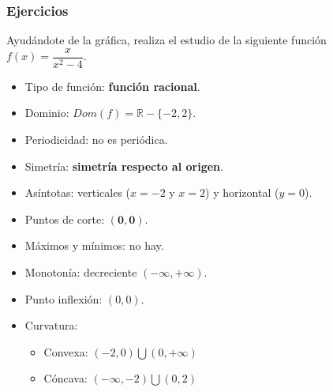\subsubsection{Ejercicios}
\begin{ex}
	Ayudándote de la gráfica, realiza el estudio de la siguiente función $f(x)=\dfrac{x}{x^2-4}$.
	\begin{sol}
		\begin{itemize}
			\item Tipo de función: \textbf{función racional}.
			\item Dominio: $Dom(f) = \mathbb{R}-\{-2, 2\}$.
			\item Periodicidad: no es periódica.
			\item Simetría: \textbf{simetría respecto al origen}.
			\item Asíntotas: verticales ($x=-2$ y $x=2$) y horizontal ($y=0$).
			\item Puntos de corte: $\mathbf{(0,0)}$.
			\item Máximos y mínimos: no hay.
			\item Monotonía: decreciente $(-\infty , +\infty)$.
			\item Punto inflexión: $(0,0)$.
			\item Curvatura:
			\begin{itemize}
				\item Convexa: $(-2, 0) \bigcup (0, +\infty)$
				\item Cóncava: $(-\infty,-2) \bigcup (0,2)$
			\end{itemize}
		\end{itemize}
	\end{sol}
\end{ex}